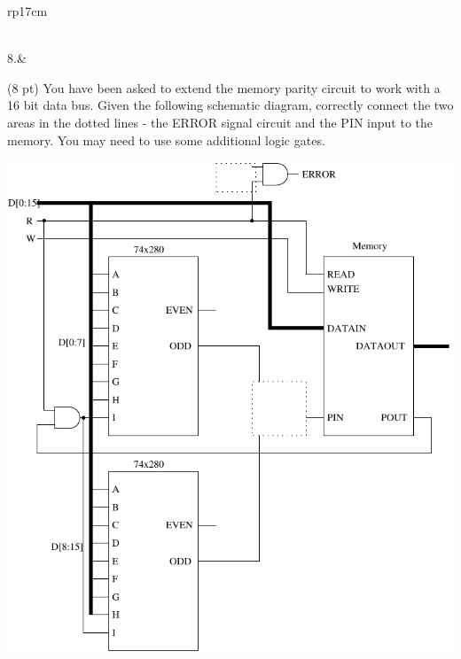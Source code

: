 \documentclass{article}
\begin{document}
\begin{longtable}[l]{rp{17cm}}
\begin{minipage}[t]{\linewidth}
\vspace{8cm
}
\end{minipage}\\
\medskip
8.&\begin{minipage}[t]{\linewidth}(8 pt) You have been asked to extend the memory parity circuit to work with a 16 bit data bus.  Given the following schematic diagram, correctly connect the two areas in the dotted lines - the ERROR signal circuit and the PIN input to the memory.  You may need to use some additional logic gates.
\begin{center}
  \includegraphics[scale=0.5]{../XOR/Assessments/MemoryCircuitParityExtended}
\end{center}


\end{minipage}
\end{longtable}
\end{document}
